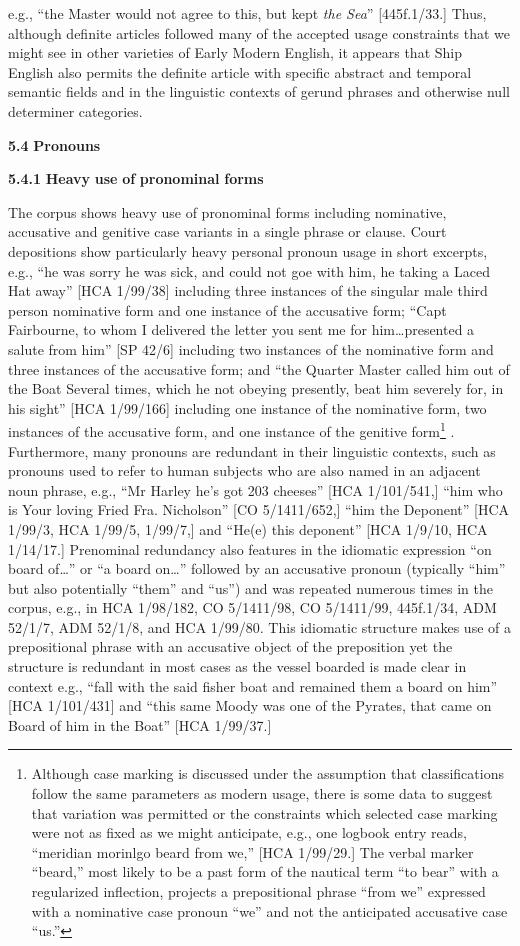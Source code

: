 e.g., “the Master would not agree to this, but kept \textit{the Sea}” [445f.1/33.] Thus, although definite articles followed many of the accepted usage constraints that we might see in other varieties of Early Modern English, it appears that Ship English also permits the definite article with specific abstract and temporal semantic fields and in the linguistic contexts of gerund phrases and otherwise null determiner categories. 

\textbf{5.4} \textbf{Pronouns}

\textbf{5.4.1} \textbf{Heavy} \textbf{use} \textbf{of} \textbf{pronominal} \textbf{forms}

The corpus shows heavy use of pronominal forms including nominative, accusative and genitive case variants in a single phrase or clause. Court depositions show particularly heavy personal pronoun usage in short excerpts, e.g., “he was sorry he was sick, and could not goe with him, he taking a Laced Hat away” [HCA 1/99/38] including three instances of the singular male third person nominative form and one instance of the accusative form; “Capt Fairbourne, to whom I delivered the letter you sent me for him…presented a salute from him” [SP 42/6] including two instances of the nominative form and three instances of the accusative form; and “the Quarter Master called him out of the Boat Several times, which he not obeying presently, beat him severely for, in his sight” [HCA 1/99/166] including one instance of the nominative form, two instances of the accusative form, and one instance of the genitive form\footnote{Although case marking is discussed under the assumption that classifications follow the same parameters as modern usage, there is some data to suggest that variation was permitted or the constraints which selected case marking were not as fixed as we might anticipate, e.g., one logbook entry reads, “meridian morinlgo beard from we,” [HCA 1/99/29.] The verbal marker “beard,” most likely to be a past form of the nautical term “to bear” with a regularized inflection, projects a prepositional phrase “from we” expressed with a nominative case pronoun “we” and not the anticipated accusative case “us.”} . Furthermore, many pronouns are redundant in their linguistic contexts, such as pronouns used to refer to human subjects who are also named in an adjacent noun phrase, e.g., “Mr Harley he’s got 203 cheeses” [HCA 1/101/541,] “him who is Your loving Fried Fra. Nicholson” [CO 5/1411/652,] “him the Deponent” [HCA 1/99/3, HCA 1/99/5, 1/99/7,] and “He(e) this deponent” [HCA 1/9/10, HCA 1/14/17.] Prenominal redundancy also features in the idiomatic expression “on board of…” or “a board on…” followed by an accusative pronoun (typically “him” but also potentially “them” and “us”) and was repeated numerous times in the corpus, e.g., in HCA 1/98/182, CO 5/1411/98, CO 5/1411/99, 445f.1/34, ADM 52/1/7, ADM 52/1/8, and HCA 1/99/80. This idiomatic structure makes use of a prepositional phrase with an accusative object of the preposition yet the structure is redundant in most cases as the vessel boarded is made clear in context e.g., “fall with the said fisher boat and remained them a board on him” [HCA 1/101/431] and “this same Moody was one of the Pyrates, that came on Board of him in the Boat” [HCA 1/99/37.] 